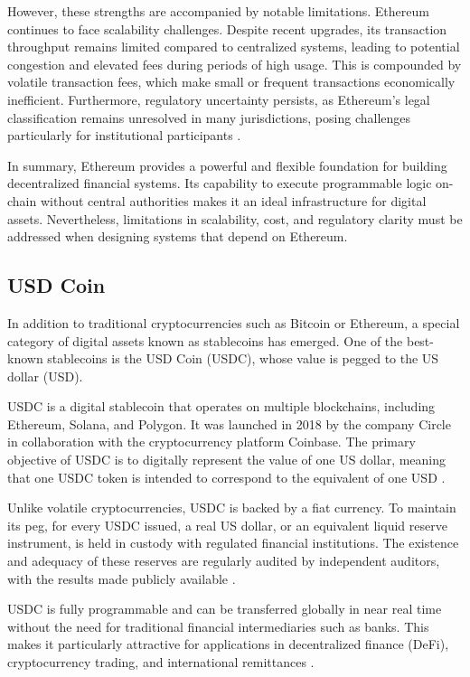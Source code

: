 However, these strengths are accompanied by notable limitations.
Ethereum continues to face scalability challenges.
Despite recent upgrades, its transaction throughput remains limited compared to centralized systems, leading to potential congestion and elevated fees during periods of high usage.
This is compounded by volatile transaction fees, which make small or frequent transactions economically inefficient.
Furthermore, regulatory uncertainty persists, as Ethereum’s legal classification remains unresolved in many jurisdictions, posing challenges particularly for institutional participants \cite{eth-3}.


In summary, Ethereum provides a powerful and flexible foundation for building decentralized financial systems.
Its capability to execute programmable logic on-chain without central authorities makes it an ideal infrastructure for digital assets.
Nevertheless, limitations in scalability, cost, and regulatory clarity must be addressed when designing systems that depend on Ethereum.


\subsection{USD Coin}


In addition to traditional cryptocurrencies such as Bitcoin or Ethereum, a special category of digital assets known as stablecoins has emerged.
One of the best-known stablecoins is the USD Coin (USDC), whose value is pegged to the US dollar (USD).

USDC is a digital stablecoin that operates on multiple blockchains, including Ethereum, Solana, and Polygon.
It was launched in 2018 by the company Circle in collaboration with the cryptocurrency platform Coinbase.
The primary objective of USDC is to digitally represent the value of one US dollar, meaning that one USDC token is intended to correspond to the equivalent of one USD \cite{usdc-1}.


Unlike volatile cryptocurrencies, USDC is backed by a fiat currency.
To maintain its peg, for every USDC issued, a real US dollar, or an equivalent liquid reserve instrument, is held in custody with regulated financial institutions.
The existence and adequacy of these reserves are regularly audited by independent auditors, with the results made publicly available \cite{usdc-2}.


USDC is fully programmable and can be transferred globally in near real time without the need for traditional financial intermediaries such as banks.
This makes it particularly attractive for applications in decentralized finance (DeFi), cryptocurrency trading, and international remittances \cite{circle-usdc}.


